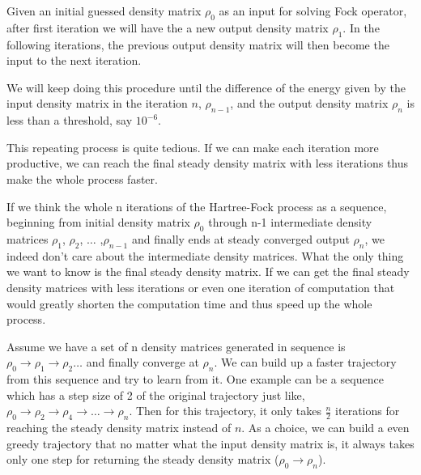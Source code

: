 \documentclass[twoside]{article}
\begin{document}
Given an initial guessed density matrix $\rho_0$ as an input for solving Fock operator, after first iteration we will have the a new output density matrix $\rho_1$. In the following iterations, the previous output density matrix will then become the input to the next iteration. 

We will keep doing this procedure until the difference of the energy given by the input density matrix in the iteration $n$, $\rho_{n-1}$,  and the output density matrix $\rho_n$ is less than a threshold, say $10^{-6}$. 

This repeating process is quite tedious. If we can make each iteration more productive, we can reach the final steady density matrix with less iterations thus make the whole process faster.

If we think the whole n iterations of the Hartree-Fock process as a sequence, beginning from initial density matrix $\rho_0$ through n-1 intermediate density matrices $\rho_1$,  $\rho_2$,  $\ldots$ ,$\rho_{n-1}$ and finally ends at steady converged output $\rho_{n}$, we indeed don't care about the intermediate density matrices. What the only thing we want to know is the final steady density matrix. If we can get the final steady density matrices with less iterations or even one iteration of computation that would greatly shorten the computation time and thus speed up the whole process. 



Assume we have a set of n density matrices generated in sequence is  $\rho_0 \rightarrow  \rho_1 \rightarrow  \rho_2  \ldots  $ and finally converge at $\rho_{n}$. 
We can build up a faster trajectory from this sequence and try to learn from it.
One example can be a sequence which has a step size of 2 of the original trajectory just like, $\rho_0 \rightarrow \rho_2 \rightarrow  \rho_4 \rightarrow  \ldots \rightarrow  \rho_{n}$. Then for this trajectory, it only takes $\frac{n}{2}$ iterations for reaching the steady density matrix instead of $n$.
As a choice, we can build a even greedy trajectory that no matter what the input density matrix is, it always takes only one step for returning the steady density matrix ($\rho_0 \rightarrow \rho_{n}$).
\end{document}
